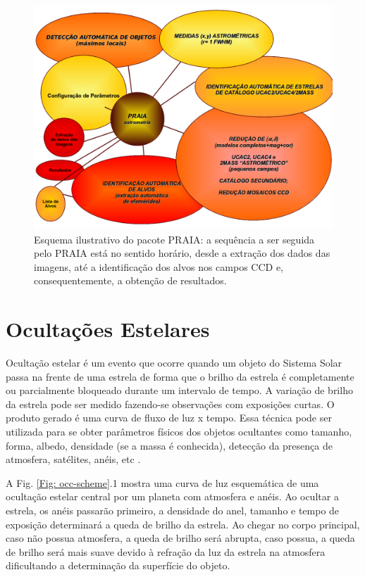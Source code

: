 \documentclass[12pt,a4paper]{monografia}
\begin{document}
\begin{figure}[h]
\centering
\includegraphics[scale=0.4]{figuras/PRAIA.png}
\caption[Esquema ilustrativo do pacote PRAIA]{Esquema ilustrativo do pacote PRAIA: a sequência a ser seguida pelo PRAIA está no sentido horário, desde a extração dos dados das imagens, até a identificação dos alvos nos campos CCD e, consequentemente, a obtenção de resultados.}
\label{Fig:PRAIA}
\end{figure}

\chapter{Ocultações Estelares}
\label{Cap: ocultacoes}

\indent \indent Ocultação estelar é um evento que ocorre quando um objeto do Sistema Solar passa na frente de uma estrela de forma que o brilho da estrela é completamente ou parcialmente bloqueado durante um intervalo de tempo. A variação de brilho da estrela pode ser medido fazendo-se observações com exposições curtas. O produto gerado é uma curva de fluxo de luz x tempo. Essa técnica pode ser utilizada para se obter parâmetros físicos dos objetos ocultantes como tamanho, forma, albedo, densidade (se a massa é conhecida), detecção da presença de atmosfera, satélites, anéis, etc \citep{Elliot1979}.

A Fig. \ref{Fig: occ-scheme}.1 mostra uma curva de luz esquemática de uma ocultação estelar central por um planeta com atmosfera e anéis. Ao ocultar a estrela, os anéis passarão primeiro, a densidade do anel, tamanho e tempo de exposição determinará a queda de brilho da estrela. Ao chegar no corpo principal, caso não possua atmosfera, a queda de brilho será abrupta, caso possua, a queda de brilho será mais suave devido à refração da luz da estrela na atmosfera dificultando a determinação da superfície do objeto.
\end{document}
